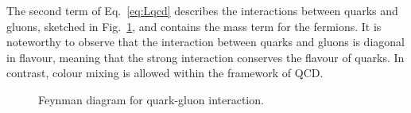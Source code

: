 The second term of Eq.~\ref{eq:Lqcd} describes the interactions between quarks and gluons, sketched in Fig.~\ref{fig:Feynman_q_g}, and contains the mass term for the fermions. It is noteworthy to observe that the interaction between quarks and gluons is diagonal in flavour, meaning that the strong interaction conserves the flavour of quarks. In contrast, colour mixing is allowed within the framework of QCD.

\begin{figure}[htb]
    \centering
    \caption{Feynman diagram for quark-gluon interaction.}
    \label{fig:Feynman_q_g}
\end{figure}

